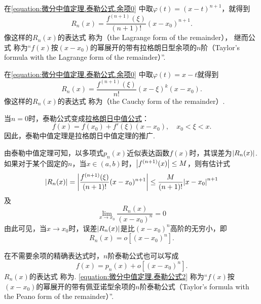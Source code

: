 在\cref{equation:微分中值定理.泰勒公式.余项0} 中取\(\varphi(t) = (x-t)^{n+1}\)，就得到
\begin{equation}\label{equation:微分中值定理.泰勒公式.余项1}
R_n(x) = \frac{f^{(n+1)}(\xi)}{(n+1)!} (x-x_0)^{n+1}.
\end{equation}
像这样的\(R_n(x)\)的表达式  称为（the Lagrange form of the remainder），%
继而公式  称为“\(f(x)\)按\((x-x_0)\)的幂展开的带有拉格朗日型余项的\(n\)阶（Taylor's formula with the Lagrange form of the remainder）”.

在\cref{equation:微分中值定理.泰勒公式.余项0} 中取\(\varphi(t) = x-t\)就得到
\begin{equation}\label{equation:微分中值定理.泰勒公式.余项4}
R_n(x) = \frac{f^{(n+1)}(\xi)}{n!} (x-\xi)^k (x-x_0).
\end{equation}
像这样的\(R_n(x)\)的表达式  称为（the Cauchy form of the remainder）.

当\(n=0\)时，泰勒公式变成\hyperref[equation:微分中值定理.拉格朗日中值公式]{拉格朗日中值公式}：\[
f(x) = f(x_0) + f'(\xi) (x-x_0), \quad x_0 < \xi < x.
\]因此，泰勒中值定理是拉格朗日中值定理的推广.

由泰勒中值定理可知，以多项式\(p_n(x)\)近似表达函数\(f(x)\)时，其误差为\(\abs{R_n(x)}\).如果对于某个固定的\(n\)，当\(x\in(a,b)\)时，\(\abs{f^{(n+1)}(x)} \leq M\)，则有估计式\begin{equation}\label{equation:微分中值定理.泰勒公式.误差1}
\abs{R_n(x)}
= \abs{\frac{f^{(n+1)}(\xi)}{(n+1)!} (x-x_0)^{n+1}}
\leq \frac{M}{(n+1)!} \abs{x-x_0}^{n+1}
\end{equation}及\[
\lim\limits_{x \to x_0} \frac{R_n(x)}{(x-x_0)^n} = 0
\]由此可见，当\(x \to x_0\)时，误差\(\abs{R_n(x)}\)是比\((x-x_0)^n\)高阶的无穷小，即\begin{equation}\label{equation:微分中值定理.泰勒公式.余项2}
R_n(x) = o[(x-x_0)^n].
\end{equation}

在不需要余项的精确表达式时，\(n\)阶泰勒公式也可以写成
\begin{equation}\label{equation:微分中值定理.泰勒公式2}
f(x) = p_n(x) + o[(x - x_0)^n].
\end{equation}
\(R_n(x)\)的表达式  称为.
\cref{equation:微分中值定理.泰勒公式2} 称为“\(f(x)\)按\((x-x_0)\)的幂展开的带有佩亚诺型余项的\(n\)阶泰勒公式（Taylor's formula with the Peano form of the remainder）”.

